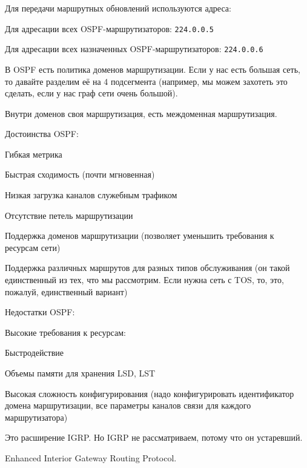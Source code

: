 Для передачи маршрутных обновлений используются адреса:
\begin{MyItemize}
    \item Для адресации всех OSPF-маршрутизаторов: {\tt 224.0.0.5}
    \item Для адресации всех назначенных OSPF-маршрутизаторов: {\tt 224.0.0.6}
\end{MyItemize}

В OSPF есть политика доменов маршрутизации. Если у нас есть большая сеть, то давайте разделим её на 4 подсегмента (например, мы можем захотеть это сделать, если у нас граф сети очень большой).

Внутри доменов своя маршрутизация, есть междоменная маршрутизация. 

Достоинства OSPF:
\begin{MyItemize}
    \item Гибкая метрика
    \item Быстрая сходимость (почти мгновенная)
    \item Низкая загрузка каналов служебным трафиком
    \item Отсутствие петель маршрутизации
    \item Поддержка доменов маршрутизации (позволяет уменьшить требования к ресурсам сети)
    \item Поддержка различных маршрутов для разных типов обслуживания (он такой единственный из тех, что мы рассмотрим. Если нужна сеть с TOS, то, это, пожалуй, единственный вариант)
\end{MyItemize}
Недостатки OSPF:
\begin{MyItemize}
    \item Высокие требования к ресурсам:
    \begin{MyItemize}
        \item Быстродействие
        \item Объемы памяти для хранения LSD, LST
    \end{MyItemize}
    \item Высокая сложность конфигурирования (надо конфигурировать идентификатор домена маршрутизации, все параметры каналов связи для каждого маршрутизатора)
\end{MyItemize}


Это расширение IGRP. Но IGRP не рассматриваем, потому что он устаревший.

Enhanced Interior Gateway Routing Protocol.

